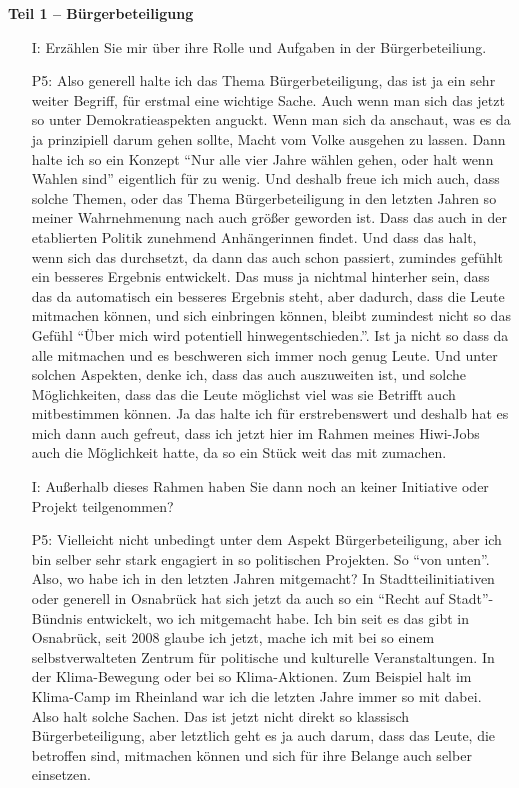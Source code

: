 \textbf{Teil 1 -- B{\"u}rgerbeteiligung}
\begin{itemize}
    \item[I:] Erz{\"a}hlen Sie mir {\"u}ber ihre Rolle und Aufgaben in der B{\"u}rgerbeteiliung.
    \item[P5:] Also generell halte ich das Thema B{\"u}rgerbeteiligung, das ist ja ein sehr weiter Begriff, f{\"u}r erstmal eine wichtige Sache. Auch wenn man sich das jetzt so unter Demokratieaspekten anguckt. Wenn man sich da anschaut, was es da ja prinzipiell darum gehen sollte, Macht vom Volke ausgehen zu lassen. Dann halte ich so ein Konzept "`Nur alle vier Jahre w{\"a}hlen gehen, oder halt wenn Wahlen sind"' eigentlich f{\"u}r zu wenig. Und deshalb freue ich mich auch, dass solche Themen, oder das Thema B{\"u}rgerbeteiligung in den letzten Jahren so meiner Wahrnehmenung nach auch gr{\"o}{\ss}er geworden ist. Dass das auch in der etablierten Politik zunehmend Anh{\"a}ngerinnen findet. Und dass das halt, wenn sich das durchsetzt, da dann das auch schon passiert, zumindes gef{\"u}hlt ein besseres Ergebnis entwickelt. Das muss ja nichtmal hinterher sein, dass das da automatisch ein besseres Ergebnis steht, aber dadurch, dass die Leute mitmachen k{\"o}nnen, und sich einbringen k{\"o}nnen, bleibt zumindest nicht so das Gef{\"u}hl "`{\"U}ber mich wird potentiell hinwegentschieden."'. Ist ja nicht so dass da alle mitmachen und es beschweren sich immer noch genug Leute. Und unter solchen Aspekten, denke ich, dass das auch auszuweiten ist, und solche M{\"o}glichkeiten, dass das die Leute m{\"o}glichst viel was sie Betrifft auch mitbestimmen k{\"o}nnen. Ja das halte ich f{\"u}r erstrebenswert und deshalb hat es mich dann auch	gefreut, dass ich jetzt hier im Rahmen meines Hiwi-Jobs auch die M{\"o}glichkeit hatte, da so ein St{\"u}ck weit das mit zumachen.
    \item[I:] Au{\ss}erhalb dieses Rahmen haben Sie dann noch an keiner Initiative oder Projekt teilgenommen?
    \item[P5:] Vielleicht nicht unbedingt unter dem Aspekt B{\"u}rgerbeteiligung, aber ich bin selber sehr stark engagiert in so politischen Projekten. So "`von unten"'. Also, wo habe ich in den letzten Jahren mitgemacht? In Stadtteilinitiativen oder generell in Osnabr{\"u}ck hat sich jetzt da auch so ein "`Recht auf Stadt"'-B{\"u}ndnis entwickelt, wo ich mitgemacht habe. Ich bin seit es das gibt in Osnabr{\"u}ck, seit 2008 glaube ich jetzt, mache ich mit bei so einem selbstverwalteten Zentrum f{\"u}r politische und kulturelle Veranstaltungen. In der Klima-Bewegung oder bei so Klima-Aktionen. Zum Beispiel halt im Klima-Camp im Rheinland war ich die letzten Jahre immer so mit dabei. Also halt solche Sachen. Das ist jetzt nicht direkt so klassisch B{\"u}rgerbeteiligung, aber letztlich geht es ja auch darum, dass das Leute, die betroffen sind, mitmachen k{\"o}nnen und sich f{\"u}r ihre Belange auch selber einsetzen.

\end{itemize}
